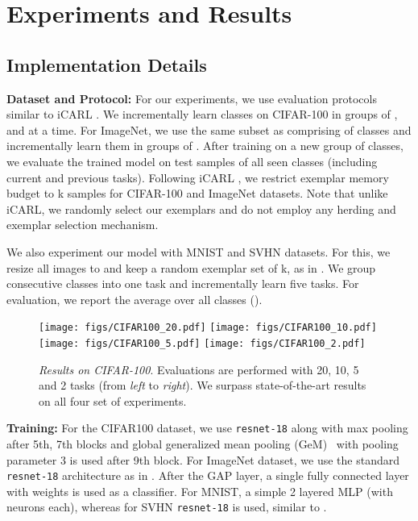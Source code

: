 
\section{Experiments and Results}
\subsection{Implementation Details}
\textbf{Dataset and Protocol:} For our experiments, we use evaluation protocols similar to iCARL \cite{rebuffi2017icarl}. We incrementally learn  classes on CIFAR-100 in groups of ,  and  at a time. For ImageNet, we use the same subset as \cite{rebuffi2017icarl} comprising of  classes and incrementally learn them in groups of . After training on a new group of classes, we evaluate the trained model on test samples of all seen classes (including current and previous tasks). Following iCARL \cite{rebuffi2017icarl}, we restrict exemplar memory budget to k samples for CIFAR-100 and ImageNet datasets. Note that unlike iCARL, we randomly select our exemplars and do not employ any herding and exemplar selection mechanism.

We also experiment our model with MNIST and SVHN datasets. For this, we resize all images to  and keep a random exemplar set of k, as in \cite{Hsu18_EvalCL}. We group  consecutive classes into one task and incrementally learn  five tasks. For evaluation, we report the average over all classes ().  

\begin{figure*}[htp]
\center
\texttt{[image: figs/CIFAR100\_20.pdf]}
\texttt{[image: figs/CIFAR100\_10.pdf]}
\texttt{[image: figs/CIFAR100\_5.pdf]}
\texttt{[image: figs/CIFAR100\_2.pdf]}
\caption{ \emph{Results on CIFAR-100}. Evaluations are performed with 20, 10, 5 and 2 tasks (from \emph{left} to \emph{right}). We surpass state-of-the-art results on all four set of experiments. }\label{fig:iCIFAR} 
\end{figure*}

\textbf{Training:}
For the CIFAR100 dataset, we use \texttt{resnet-18} along with max pooling after 5th, 7th blocks and global generalized mean pooling (GeM)~\cite{GeM_pooling} with pooling parameter 3 is used after 9th block. For ImageNet dataset, we use the standard \texttt{resnet-18} architecture as in  \cite{rebuffi2017icarl}. After the GAP layer, a single fully connected layer with weights   is used as a classifier. For MNIST, a simple 2 layered MLP (with  neurons each), whereas for SVHN \texttt{resnet-18} is used, similar to \cite{Hsu18_EvalCL}.

